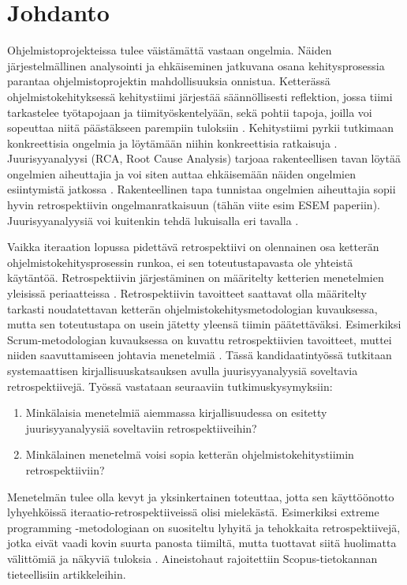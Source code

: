 
\section{Johdanto}

Ohjelmistoprojekteissa tulee väistämättä vastaan ongelmia. Näiden järjestelmällinen analysointi ja ehkäiseminen jatkuvana osana kehitysprosessia parantaa ohjelmistoprojektin mahdollisuuksia onnistua. Ketterässä ohjelmistokehityksessä kehitystiimi järjestää säännöllisesti reflektion, jossa tiimi tarkastelee työtapojaan ja tiimityöskentelyään, sekä pohtii tapoja, joilla voi sopeuttaa niitä päästäkseen parempiin tuloksiin \citep{AgileRetros2006}. Kehitystiimi pyrkii tutkimaan konkreettisia ongelmia ja löytämään niihin konkreettisia ratkaisuja \citep{AgileRetros2006}. Juurisyyanalyysi (RCA, Root Cause Analysis) tarjoaa rakenteellisen tavan löytää ongelmien aiheuttajia ja voi siten auttaa ehkäisemään näiden ongelmien esiintymistä jatkossa \citep{Lehtinen2011}. Rakenteellinen tapa tunnistaa ongelmien aiheuttajia sopii hyvin retrospektiivin ongelmanratkaisuun (tähän viite esim ESEM paperiin). Juurisyyanalyysiä voi kuitenkin tehdä lukuisalla eri tavalla \citep{Lehtinen2011}.

Vaikka iteraation lopussa pidettävä retrospektiivi on olennainen osa ketterän ohjelmistokehitysprosessin runkoa, ei sen toteutustapavasta ole yhteistä käytäntöä. Retrospektiivin järjestäminen on määritelty ketterien menetelmien yleisissä periaatteissa \citep{AgileManifestoPrinciples}. Retrospektiivin tavoitteet saattavat olla määritelty tarkasti noudatettavan ketterän ohjelmistokehitysmetodologian kuvauksessa, mutta sen toteutustapa on usein jätetty yleensä tiimin päätettäväksi. Esimerkiksi Scrum-metodologian kuvauksessa on kuvattu retrospektiivien tavoitteet, muttei niiden saavuttamiseen johtavia menetelmiä \citep{ScrumGuide2011}.
Tässä kandidaatintyössä tutkitaan systemaattisen kirjallisuuskatsauksen \citep{Kitchenham2010} avulla juurisyyanalyysiä soveltavia retrospektiivejä. Työssä vastataan seuraaviin tutkimuskysymyksiin:
\begin{enumerate}
\item Minkälaisia menetelmiä aiemmassa kirjallisuudessa on esitetty juurisyyanalyysiä soveltaviin retrospektiiveihin?
\item Minkälainen menetelmä voisi sopia ketterän ohjelmistokehitystiimin retrospektiiviin?
\end{enumerate}
Menetelmän tulee olla kevyt ja yksinkertainen toteuttaa, jotta sen käyttöönotto lyhyehköissä iteraatio-retrospektiiveissä olisi mielekästä. Esimerkiksi extreme programming -metodologiaan on suositeltu lyhyitä ja tehokkaita retrospektiivejä, jotka eivät vaadi kovin suurta panosta tiimiltä, mutta tuottavat siitä huolimatta välittömiä ja näkyviä tuloksia \citep{myllyaho2004review}. Aineistohaut rajoitettiin Scopus-tietokannan tieteellisiin artikkeleihin.

